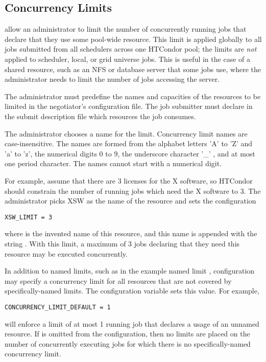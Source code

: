 \subsection{\label{sec:Concurrency-Limits}Concurrency Limits} 

 allow an administrator to limit the number
of concurrently running jobs that declare that they use some
pool-wide resource.  
This limit is applied globally to all jobs
submitted from all schedulers across one HTCondor pool;
the limits are \emph{not} applied to scheduler, local, or grid universe jobs.
This is useful in the case of a shared resource, 
such as an NFS or database server that some jobs use, 
where the administrator needs to limit the
number of jobs accessing the server.

The administrator must predefine the names and capacities of the
resources to be limited in the negotiator's configuration file.
The job submitter must declare in the submit description file which 
resources the job consumes.

The administrator chooses a name for the limit.
Concurrency limit names are case-insensitive.
The names are formed from  the alphabet letters 'A' to 'Z' and 'a' to 'z', 
the numerical digits 0 to 9, 
the underscore character  '\_' , and at most one period character.
The names cannot start with a numerical digit.

For example, assume that there are 3 licenses for the X software,
so HTCondor should constrain the number of running jobs which need the
X software to 3.  
The administrator picks XSW as the name of the resource
and sets the configuration
\begin{verbatim}
XSW_LIMIT = 3
\end{verbatim}
where  is the invented name of this resource,
and this name is appended with the string .
With this limit, a maximum of 3 jobs declaring that they need this
resource may be executed concurrently.

In addition to named limits, such as in the example named limit ,
configuration may specify a concurrency limit for all resources
that are not covered by specifically-named limits.
The configuration variable  sets
this value.  For example,
\begin{verbatim}
CONCURRENCY_LIMIT_DEFAULT = 1
\end{verbatim}
will enforce a limit of at most 1 running job that declares a
usage of an unnamed resource.
If  is omitted from the configuration,
then no limits are placed on the number of concurrently
executing jobs for which there is no specifically-named
concurrency limit.

